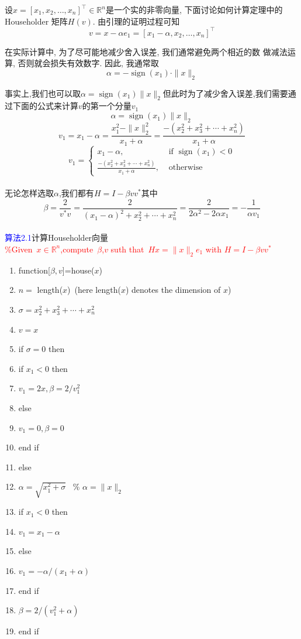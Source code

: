 \documentclass[12pt,a4paper]{article}
\begin{document}
设$x=\left[x_{1}, x_{2}, \ldots, x_{n}\right]^{\top} \in \mathbb{R}^{n}$是一个实的非零向量, 下面讨论如何计算定理中的 Householder 矩阵$H(v)$. 由引理的证明过程可知$$
v=x-\alpha e_{1}=\left[x_{1}-\alpha, x_{2}, \ldots, x_{n}\right]^{\top}
$$

在实际计算中, 为了尽可能地减少舍入误差, 我们通常避免两个相近的数
做减法运算, 否则就会损失有效数字. 因此, 我通常取$$
\alpha=-\operatorname{sign}\left(x_{1}\right) \cdot\|x\|_{2}
$$

事实上,我们也可以取$\alpha=\operatorname{sign}\left(x_{1}\right)\|x\|_{2}$但此时为了减少舍入误差,我们需要通过下面的公式来计算$v$的第一个分量$v_1$
$$
\alpha=\operatorname{sign}\left(x_{1}\right)\|x\|_{2}
$$
$$
v_{1}=x_{1}-\alpha=\frac{x_{1}^{2}-\|x\|_{2}^{2}}{x_{1}+\alpha}=\frac{-\left(x_{2}^{2}+x_{3}^{2}+\cdots+x_{n}^{2}\right)}{x_{1}+\alpha}
$$
$$
v_{1}=\left\{\begin{array}{ll}{x_{1}-\alpha,} & {\text { if } \operatorname{sign}\left(x_{1}\right)<0} \\ {\frac{-\left(x_{2}^{2}+x_{3}^{2}+\cdots+x_{n}^{2}\right)}{x_{1}+\alpha},} & {\text { otherwise }}\end{array}\right.
$$\\无论怎样选取$\alpha$,我们都有$H=I-\beta v v^*$其中$$
\beta=\frac{2}{v^{*} v}=\frac{2}{\left(x_{1}-\alpha\right)^{2}+x_{2}^{2}+\cdots+x_{n}^{2}}=\frac{2}{2 \alpha^{2}-2 \alpha x_{1}}=-\frac{1}{\alpha v_{1}}
$$\\\textcolor {blue}{算法2.1}计算Householder向量\\\textcolor{red}{\%Given~$x \in \mathbb{R}^n$,compute~$\beta$,$v$ suth that~$Hx=\|x\|_{2} e_{1}$ with $H=I-\beta v v^*$}

\begin{enumerate}[1:]
	\item function[$\beta,v$]=house($x$)
	\item $n=$ length($x$)~(here length($x$) denotes the dimension of $x$)
	\item $\sigma=x_{2}^{2}+x_{3}^{2}+\cdots+x_{n}^{2}$
	\item $v=x$
	\item if $\sigma=0$ then
	\item        \qquad if $x_1<0$ then
	\item \qquad \qquad$v_1=2x,\beta=2/v_1^2$
	\item \qquad else
	\item \qquad \qquad $v_1=0,\beta=0$
	\item\qquad end if
	\item else
	\item \qquad $\alpha=\sqrt{x_1^2+\sigma}$ ~\% $\alpha =\|x\|_2$
	\item \qquad if $x_1<0$ then
	\item \qquad \qquad $v_1=x_1-\alpha$
	\item \qquad else
	\item \qquad \qquad $v_1=-\alpha/(x_1+\alpha)$
	\item \qquad end if 
	\item \qquad $\beta=2/(v_1^2+\alpha)$
	\item end if 
\end{enumerate}
\end{document}
